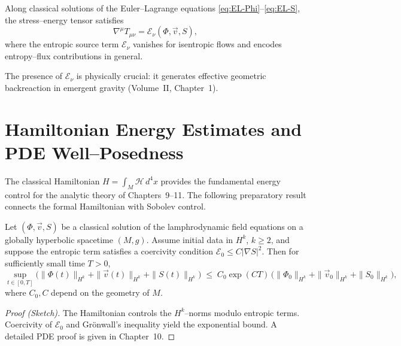 \begin{proposition}
\label{prop:energy-balance}
Along classical solutions of the Euler--Lagrange equations
\eqref{eq:EL-Phi}--\eqref{eq:EL-S},
the stress--energy tensor satisfies
\[
\nabla^{\mu}T_{\mu\nu}
= \mathscr{E}_{\nu}(\Phi,\vec v,S),
\]
where the entropic source term
$\mathscr{E}_{\nu}$ vanishes for isentropic flows and encodes
entropy--flux contributions in general.
\end{proposition}

\begin{remark}
The presence of $\mathscr{E}_{\nu}$ is physically crucial: it
generates effective geometric backreaction in emergent gravity
(Volume~II, Chapter~1).
\end{remark}



\section{Hamiltonian Energy Estimates and PDE Well--Posedness}
\label{sec:ham-energy}

The classical Hamiltonian
$H=\int_{M}\mathcal{H}\,d^{4}x$
provides the fundamental energy control for the analytic theory of
Chapters~9--11.
The following preparatory result connects the formal Hamiltonian
with Sobolev control.

\begin{theorem}
\label{thm:ham-estimate}
Let $(\Phi,\vec v,S)$ be a classical solution of the lamphrodynamic
field equations on a globally hyperbolic spacetime $(M,g)$.
Assume initial data in $H^{k}$, $k\ge2$,
and suppose the entropic term satisfies a coercivity condition
$\mathscr{E}_{0}\le C|\nabla S|^{2}$.
Then for sufficiently small time $T>0$,
\[
\sup_{t\in[0,T]}
\bigl( \|\Phi(t)\|_{H^{k}}
     +\|\vec v(t)\|_{H^{k}}
     +\|S(t)\|_{H^{k}}
\bigr)
\;\le\;
C_{0} \exp(CT)\,
\bigl( \|\Phi_{0}\|_{H^{k}}
     +\|\vec v_{0}\|_{H^{k}}
     +\|S_{0}\|_{H^{k}} \bigr),
\]
where $C_{0},C$ depend on the geometry of $M$.
\end{theorem}

\begin{proof}[Proof (Sketch)]
The Hamiltonian controls the $H^{k}$--norms modulo entropic terms.
Coercivity of $\mathscr{E}_{0}$ and Gr\"onwall's inequality yield the
exponential bound.
A detailed PDE proof is given in Chapter~10.
\end{proof}



